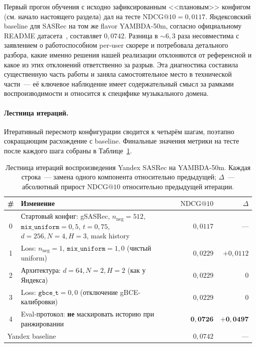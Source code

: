 Первый прогон обучения с исходно зафиксированным <<плановым>> конфигом (см. начало настоящего раздела) дал на тесте $\mathrm{NDCG@10} = 0{,}0117$. Яндексовский baseline для SASRec на том же flavor YAMBDA-50m, согласно официальному README датасета~\cite{yambda2025}, составляет $0{,}0742$. Разница в $\sim\!6{,}3$ раза несовместима с заявлением о работоспособном per-user скорере и потребовала детального разбора, какие именно решения нашей реализации отклоняются от референсной и какое из этих отклонений ответственно за разрыв. Эта диагностика составила существенную часть работы и заняла самостоятельное место в технической части~--- её ключевое наблюдение имеет содержательный смысл за рамками воспроизводимости и относится к специфике музыкального домена.

\paragraph{Лестница итераций.} Итеративный пересмотр конфигурации сводится к четырём шагам, поэтапно сокращающим расхождение с baseline. Финальные значения метрики на тесте после каждого шага собраны в Таблице~\ref{tab:setup-gap-ladder}.

\begin{table}[ht]
    \centering
    \caption{Лестница итераций воспроизведения Yandex SASRec на YAMBDA-50m. Каждая строка~--- замена одного компонента относительно предыдущей; $\Delta$~--- абсолютный прирост $\mathrm{NDCG@10}$ относительно предыдущей итерации.}
    \label{tab:setup-gap-ladder}
    \small
    \begin{tabular}{cp{}rr}
        \toprule
        \# & Изменение & $\mathrm{NDCG@10}$ & $\Delta$ \\
        \midrule
        0 & Стартовый конфиг: gSASRec, $n_{\mathrm{neg}}{=}512$, $\mathtt{mix\_uniform}{=}0{,}5$, $t{=}0{,}75$, $d{=}256, N{=}4, H{=}3$, mask history & $0{,}0117$ & --- \\
        1 & Loss: $n_{\mathrm{neg}}{=}1$, $\mathtt{mix\_uniform}{=}1{,}0$ (чистый uniform) & $0{,}0229$ & $+0{,}0112$ \\
        2 & Архитектура: $d{=}64, N{=}2, H{=}2$ (как у Яндекса) & $0{,}0229$ & $0$ \\
        3 & Loss: $\mathtt{gbce\_t}{=}0{,}0$ (отключение gBCE-калибровки) & $0{,}0229$ & $0$ \\
        4 & Eval-протокол: \textbf{не} маскировать историю при ранжировании & $\mathbf{0{,}0726}$ & $\mathbf{+0{,}0497}$ \\
        \midrule
        \multicolumn{2}{l}{Yandex baseline~\cite{yambda2025}} & $0{,}0742$ & --- \\
        \bottomrule
    \end{tabular}
\end{table}

